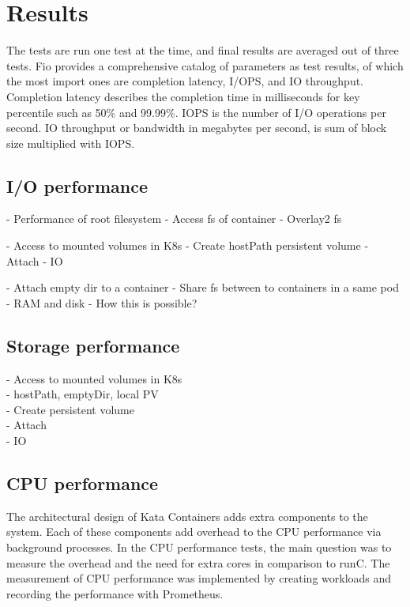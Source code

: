 \section{Results}

The tests are run one test at the time, and final results are averaged out of three tests. Fio provides a comprehensive catalog of parameters as test results, of which the most import ones are completion latency, I/OPS, and IO throughput. Completion latency describes the completion time in milliseconds for key percentile such as 50\% and 99.99\%. IOPS is the number of I/O operations per second. IO throughput or bandwidth in megabytes per second, is sum of block size multiplied with IOPS.

\subsection{I/O performance}






- Performance of root filesystem
	- Access fs of container
	- Overlay2 fs

- Access to mounted volumes in K8s
	- Create hostPath persistent volume
	- Attach
	- IO

- Attach empty dir to a container
	- Share fs between to containers in a same pod
	- RAM and disk
	- How this is possible?

\subsection{Storage performance}

- Access to mounted volumes in K8s \\
    - hostPath, emptyDir, local PV \\
	- Create persistent volume \\
	- Attach \\
	- IO

\subsection{CPU performance}

The architectural design of Kata Containers adds extra components to the system. Each of these components add overhead to the CPU performance via background processes. In the CPU performance tests, the main question was to measure the overhead and the need for extra cores in comparison to runC. The measurement of CPU performance was implemented by creating workloads and recording the performance with Prometheus. 

